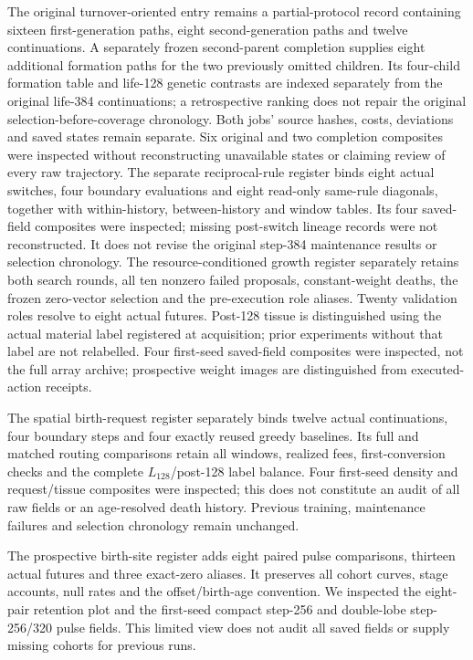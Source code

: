 The original turnover-oriented entry remains a partial-protocol record containing sixteen first-generation paths, eight second-generation paths and twelve continuations. A separately frozen second-parent completion supplies eight additional formation paths for the two previously omitted children. Its four-child formation table and life-128 genetic contrasts are indexed separately from the original life-384 continuations; a retrospective ranking does not repair the original selection-before-coverage chronology. Both jobs' source hashes, costs, deviations and saved states remain separate. Six original and two completion composites were inspected without reconstructing unavailable states or claiming review of every raw trajectory. The separate reciprocal-rule register binds eight actual switches, four boundary evaluations and eight read-only same-rule diagonals, together with within-history, between-history and window tables. Its four saved-field composites were inspected; missing post-switch lineage records were not reconstructed. It does not revise the original step-384 maintenance results or selection chronology. The resource-conditioned growth register separately retains both search rounds, all ten nonzero failed proposals, constant-weight deaths, the frozen zero-vector selection and the pre-execution role aliases. Twenty validation roles resolve to eight actual futures. Post-128 tissue is distinguished using the actual material label registered at acquisition; prior experiments without that label are not relabelled. Four first-seed saved-field composites were inspected, not the full array archive; prospective weight images are distinguished from executed-action receipts.

The spatial birth-request register separately binds twelve actual continuations, four boundary steps and four exactly reused greedy baselines. Its full and matched routing comparisons retain all windows, realized fees, first-conversion checks and the complete $L_{128}$/post-128 label balance. Four first-seed density and request/tissue composites were inspected; this does not constitute an audit of all raw fields or an age-resolved death history. Previous training, maintenance failures and selection chronology remain unchanged.

The prospective birth-site register adds eight paired pulse comparisons, thirteen actual futures and three exact-zero aliases. It preserves all cohort curves, stage accounts, null rates and the offset/birth-age convention. We inspected the eight-pair retention plot and the first-seed compact step-256 and double-lobe step-256/320 pulse fields. This limited view does not audit all saved fields or supply missing cohorts for previous runs.

